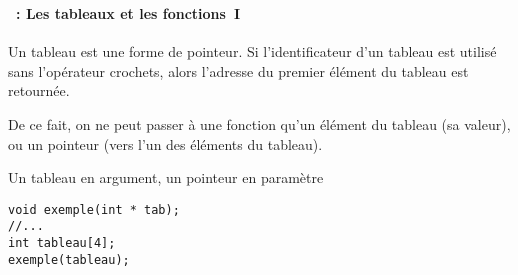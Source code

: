 \begin{frame}[containsverbatim]
  \frametitle{\secname}
  \framesubtitle{\subsecname~: Les tableaux et les fonctions~I}

  Un tableau est une forme de pointeur. Si l'identificateur d'un tableau est utilisé sans l'opérateur crochets, alors l'adresse du premier
  élément du tableau est retournée.
  \vspace{0.3cm}
  \par
  De ce fait, on ne peut passer à une fonction qu'un élément du tableau (sa valeur), ou un pointeur (vers l'un des éléments du tableau).
  \vspace{0.3cm}
  \begin{exampleblock}{Un tableau en argument, un pointeur en paramètre}
    \begin{verbatim}
void exemple(int * tab);
//...
int tableau[4];
exemple(tableau);\end{verbatim}
  \end{exampleblock}
\end{frame}

